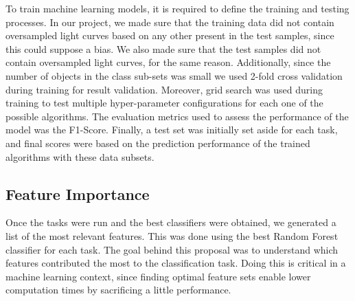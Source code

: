 To train machine learning models, it is required to define the training and testing processes. In our project, we made sure that the training data did not contain oversampled light curves based on any other present in the test samples, since this could suppose a bias. We also made sure that the test samples did not contain oversampled light curves, for the same reason. Additionally, since the number of objects in the class sub-sets was small we used 2-fold cross validation during training for result validation. Moreover, grid search was used during training to test multiple hyper-parameter configurations for each one of the possible algorithms. The evaluation metrics used to assess the performance of the model was the F1-Score. Finally, a test set was initially set aside for each task, and final scores were based on the prediction performance of the trained algorithms with these data subsets.


\subsection{Feature Importance} \label{subsection_importances}

Once the tasks were run and the best classifiers were obtained, we generated a list of the most relevant features. This was done using the best Random Forest classifier for each task. The goal behind this proposal was to understand which features contributed the most to the classification task. Doing this is critical in a machine learning context, since finding optimal feature sets enable lower computation times by sacrificing a little performance.
